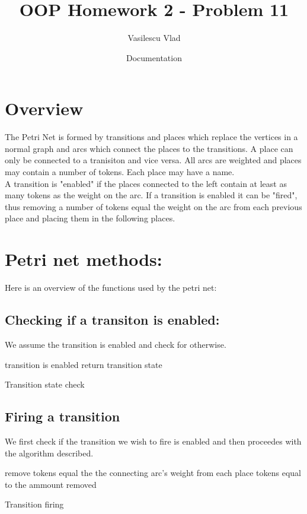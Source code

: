 \documentclass[a4paper, 12pt]{article}
\title{OOP Homework 2 - Problem 11}
\author{Vasilescu Vlad}
\date{Documentation}
\begin{document}
\maketitle

\section*{Overview}
The Petri Net is formed by transitions and places which replace the vertices in a normal graph and arcs which connect the
places to the transitions. A place can only be connected to a tranisiton and vice versa.
All arcs are weighted and places may contain a number of tokens. Each place may have a name.\\
A transition is "enabled" if the places connected to the left contain at least as many tokens as the weight on the arc.
If a transition is enabled it can be "fired", thus removing a number of tokens equal the weight on the arc from each previous place
and placing them in the following places.

\section*{Petri net methods:}
Here is an overview of the functions used by the petri net:

\subsection*{Checking if a transiton is enabled:}
We assume the transition is enabled and check for otherwise.

\begin{algorithm}[H]
    transition is enabled\;
    return transition state\;
    
    \caption{Transition state check}
\end{algorithm}

\subsection*{Firing a transition}
We first check if the transition we wish to fire is enabled and then proceedes with the algorithm described.

\begin{algorithm}[H]
     {
        remove tokens equal the the connecting arc's weight from each\;
    }
     {
        place tokens equal to the ammount removed\;
    }
    \caption{Transition firing}
\end{algorithm}
    
\end{document}

